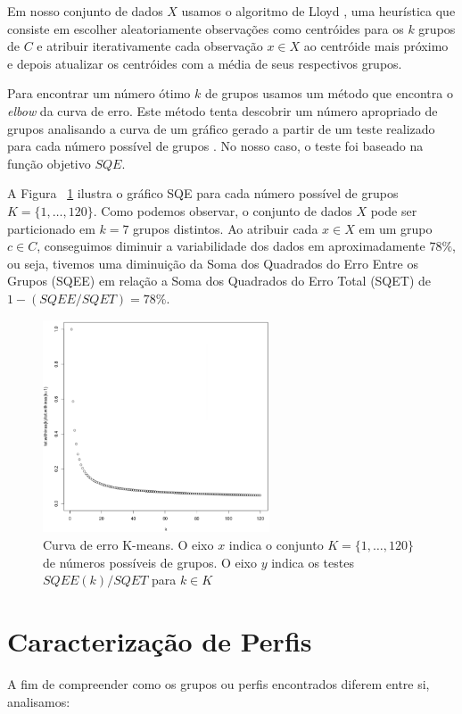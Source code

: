 Em nosso conjunto de dados $X$ usamos o algoritmo de Lloyd \cite{ong2015player}, uma heurística que consiste em escolher aleatoriamente observações como centróides para os $k$ grupos de $C$ e atribuir iterativamente cada observação $x \in X$ ao centróide mais próximo e depois atualizar os centróides com a média de seus respectivos grupos.

Para encontrar um número ótimo $k$ de grupos usamos um método que encontra o \textit{elbow} da curva de erro. Este método tenta descobrir um número apropriado de grupos analisando a curva de um gráfico gerado a partir de um teste realizado para cada número possível de grupos \cite{kodinariya2013review}. No nosso caso, o teste foi baseado na função objetivo $SQE$.

A Figura ~\ref{fig:k-means-curve} ilustra o gráfico SQE para cada número possível de grupos $K = \{1, \ldots, 120\}$. Como podemos observar, o conjunto de dados $X$ pode ser particionado em $k=7$ grupos distintos. Ao atribuir cada $x \in X$ em um grupo $c \in C$, conseguimos diminuir a variabilidade dos dados em aproximadamente $78\%$, ou seja, tivemos uma diminuição da Soma dos Quadrados do Erro Entre os Grupos (SQEE) em relação a Soma dos Quadrados do Erro Total (SQET) de $1 - (SQEE/SQET) = 78 \%$.

\begin{figure}
  \centering
  \includegraphics[width=0.6\textwidth]{k-means-curve}%
  \caption{Curva de erro K-means. O eixo $x$ indica o conjunto $K=\{1, \ldots, 120\}$ de números possíveis de grupos. O eixo $y$ indica os testes $SQEE(k)/SQET$ para $k \in K $}
  \label{fig:k-means-curve}
\end{figure}

\section{Caracterização de Perfis}
A fim de compreender como os grupos ou perfis encontrados diferem entre si, analisamos:

